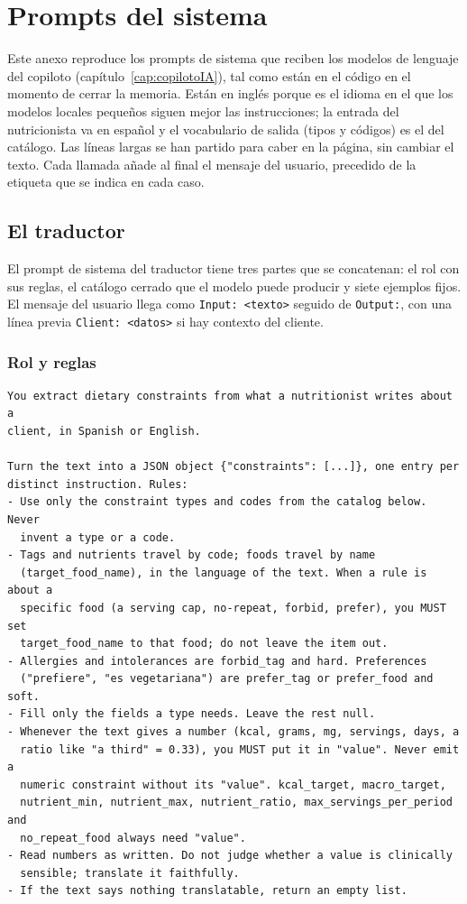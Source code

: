 \chapter{Prompts del sistema}
\label{apendice:prompts}

Este anexo reproduce los prompts de sistema que reciben los modelos de lenguaje del copiloto (capítulo~\ref{cap:copilotoIA}), tal como están en el código en el momento de cerrar la memoria. Están en inglés porque es el idioma en el que los modelos locales pequeños siguen mejor las instrucciones; la entrada del nutricionista va en español y el vocabulario de salida (tipos y códigos) es el del catálogo. Las líneas largas se han partido para caber en la página, sin cambiar el texto. Cada llamada añade al final el mensaje del usuario, precedido de la etiqueta que se indica en cada caso.

\section{El traductor}
\label{sec:anexoPromptTraductor}

El prompt de sistema del traductor tiene tres partes que se concatenan: el rol con sus reglas, el catálogo cerrado que el modelo puede producir y siete ejemplos fijos. El mensaje del usuario llega como \texttt{Input: <texto>} seguido de \texttt{Output:}, con una línea previa \texttt{Client: <datos>} si hay contexto del cliente.

\subsection*{Rol y reglas}

\begin{footnotesize}
\begin{verbatim}
You extract dietary constraints from what a nutritionist writes about a
client, in Spanish or English.

Turn the text into a JSON object {"constraints": [...]}, one entry per
distinct instruction. Rules:
- Use only the constraint types and codes from the catalog below. Never
  invent a type or a code.
- Tags and nutrients travel by code; foods travel by name
  (target_food_name), in the language of the text. When a rule is about a
  specific food (a serving cap, no-repeat, forbid, prefer), you MUST set
  target_food_name to that food; do not leave the item out.
- Allergies and intolerances are forbid_tag and hard. Preferences
  ("prefiere", "es vegetariana") are prefer_tag or prefer_food and soft.
- Fill only the fields a type needs. Leave the rest null.
- Whenever the text gives a number (kcal, grams, mg, servings, days, a
  ratio like "a third" = 0.33), you MUST put it in "value". Never emit a
  numeric constraint without its "value". kcal_target, macro_target,
  nutrient_min, nutrient_max, nutrient_ratio, max_servings_per_period and
  no_repeat_food always need "value".
- Read numbers as written. Do not judge whether a value is clinically
  sensible; translate it faithfully.
- If the text says nothing translatable, return an empty list.
\end{verbatim}
\end{footnotesize}

